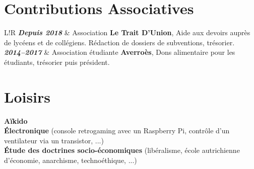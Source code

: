 \documentclass[10pt]{article}
\newcommand\VRule{\color{lightgray}\vrule width 2pt}
\begin{document}
\vspace{1ex}

\section*{Contributions Associatives}

\vspace{2ex}

\begin{tabular}{L!{\VRule}R}
\textbf{\textit{Depuis 2018}} & Association \textbf{Le Trait D’Union}, Aide aux devoirs auprès de lycéens et de collégiens. Rédaction de dossiers de subventions, trésorier. \\[0.75cm]

\textbf{\textit{2014--2017}} & Association étudiante \textbf{Averroès}, Dons alimentaire pour les étudiants, trésorier puis président. \\
\end{tabular}

\section*{Loisirs}

\vspace{2ex}

\hspace*{1ex} \textbf{Aïkido} \\
\hspace*{1ex} \textbf{Électronique} (console retrogaming avec un Raspberry Pi, contrôle d'un ventilateur via un transistor, ...) \\
\hspace*{1ex} \textbf{Étude des doctrines socio-économiques} (libéralisme, école autrichienne d'économie, anarchisme, technoéthique, ...) \\
\end{document}

